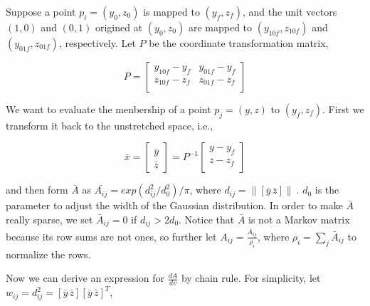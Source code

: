 \documentclass{article}
\begin{document}
Suppose a point $p_i = (y_{0},z_{0})$ is mapped to $(y_{f},z_{f})$, and the unit vectors $(1,0)$ and $(0,1)$ origined at $(y_{0},z_{0})$ are mapped to $(y_{10f},z_{10f})$ and $(y_{01f},z_{01f})$, respectively. Let $P$ be the coordinate transformation matrix, 

\begin{equation}
P = \left[
    \begin{matrix}
      y_{10f}-y_{f} & y_{01f}-y_{f} \\
      z_{10f}-z_{f} & z_{01f}-z_{f} \\
    \end{matrix} \right]
\end{equation}

We want to evaluate the menbership of a point $p_j = (y,z)$ to $(y_{f},z_{f})$. First we transform it back to the unstretched space, i.e., 
  
\begin{equation} 
 \bar{x} = 
 \left[   
   \begin{matrix}     
           \bar{y} \\\bar{z} 
   \end{matrix}
  \right]
    = P^{-1}
  \left[  
   \begin{matrix}
           y-y_{f}\\z-z_{f}\\
   \end{matrix}
  \right] 
\end{equation}

and then form $\bar{A}$ as $\bar{A_{ij}} = exp(d_{ij}^{2}/{d^{2}_{0}})/\pi$, where $d_{ij} = \|[\bar{y} \, \bar{z}]\|\ $. $d_0$ is the parameter to adjust the width of the Gaussian distribution. In order to make $\bar{A}$ really sparse, we set $\bar{A}_{ij}=0$ if $d_{ij}>2d_{0}$. Notice that $\bar{A}$ is not a Markov matrix because its row sums are not ones, so further let $A_{ij} = \frac{\bar{A}_{ij}}{\rho_{i}}$, where $\rho_{i}=\sum_{j}\bar{A}_{ij}$ to normalize the rows.   
  
Now we can derive an expression for $\frac{dA}{dv}$ by chain rule. For simplicity, let $w_{ij} = d_{ij}^{2} = [\bar{y} \, \bar{z}][\bar{y} \, \bar{z}]^{T}$, 
 
\end{document}
